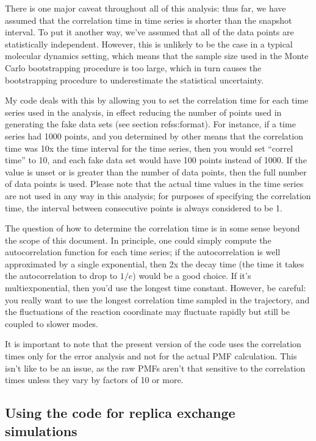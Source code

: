 \documentclass[12pt]{article}
\begin{document}
There is one major caveat throughout all of this analysis: thus far, we have
assumed that the correlation time in time series is shorter than the snapshot
interval.  To put it another way, we've assumed that all of the data points
are statistically independent.  However, this is unlikely to be the case in a
typical molecular dynamics setting, which means that the sample size used in
the Monte Carlo bootstrapping procedure is too large, which in turn causes
the bootstrapping procedure to underestimate the statistical uncertainty.  

My code deals with this by allowing you to set the correlation time for each
time series used in the analysis, in effect reducing the number of points
used in generating the fake data sets (see section ref{ss:format}).  For
instance, if a time series had 1000 points, and you determined by other means
that the correlation time was 10x the time interval for the time series, then
you would set ``correl time'' to 10, and each fake data set would have 100
points instead of 1000.  If the value is unset or is greater than the number
of data points, then the full number of data points is used.  Please note
that the actual time values in the time series are not used in any way in
this analysis; for purposes of specifying the correlation time, the interval
between consecutive points is always considered to be 1.

The question of how to determine the correlation time is in some sense beyond
the scope of this document.  In principle, one could simply compute the
autocorrelation function for each time series; if the autocorrelation is well
approximated by a single exponential, then 2x the decay time (the time it
takes the autocorrelation to drop to $1/e$) would be a good choice.  If it's
multiexponential, then you'd use the longest time constant.  However, be
careful: you really want to use the longest correlation time sampled in the
trajectory, and the fluctuations of the reaction coordinate may fluctuate
rapidly but still be coupled to slower modes.  

It is important to note that the present version of the code uses the
correlation times only for the error analysis and not for the actual PMF
calculation.  This isn't like to be an issue, as the raw PMFs aren't that
sensitive to the correlation times unless they vary by factors of 10 or more.  


\subsection{Using the code for replica exchange simulations}
\label{ss:repex}
\end{document}
